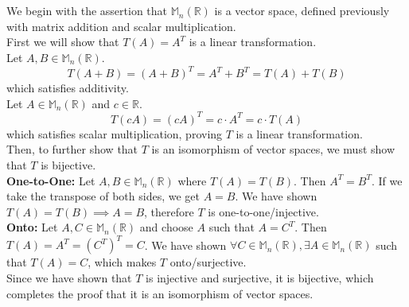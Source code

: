 \documentclass[]{article}
\newcommand{\reals}{\mathbb{R}}
\begin{document}
\section{}
We begin with the assertion that $\mathbb{M}_n(\reals)$ is a vector space, defined previously with matrix addition and scalar multiplication.\\
First we will show that $T(A) = A^T$ is a linear transformation.\\
Let $A, B \in \mathbb{M}_n(\reals)$.
\[ T(A + B) = (A + B)^T = A^T + B^T = T(A) + T(B) \]
which satisfies additivity.\\
Let $A \in \mathbb{M}_n(\reals)$ and $c \in \reals$.
\[ T(cA) = (cA)^T = c \cdot A^T = c \cdot T(A) \]
which satisfies scalar multiplication, proving $T$ is a linear transformation.\\
Then, to further show that $T$ is an isomorphism of vector spaces, we must show that $T$ is bijective.\\
\textbf{One-to-One:} Let $A, B \in \mathbb{M}_n(\reals)$ where $T(A) = T(B)$. Then $A^T = B^T$. If we take the transpose of both sides, we get $A = B$. We have shown $T(A) = T(B) \implies A = B$, therefore $T$ is one-to-one/injective.\\
\textbf{Onto:} Let $A, C \in \mathbb{M}_n(\reals)$ and choose $A$ such that $A = C^T$. Then $T(A) = A^T = (C^T)^T = C$. We have shown $\forall C \in \mathbb{M}_n(\reals), \exists A \in \mathbb{M}_n(\reals)$ such that $T(A) = C$, which makes $T$ onto/surjective.\\
Since we have shown that $T$ is injective and surjective, it is bijective, which completes the proof that it is an isomorphism of vector spaces.
\end{document}
